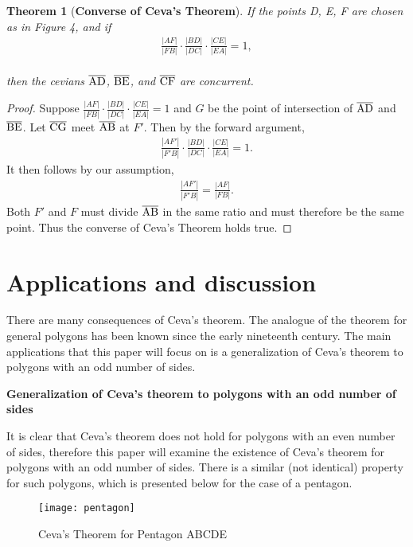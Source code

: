 \documentclass[12pt,a4paper,reqno,parskip=full]{amsart}
\numberwithin{equation}{section}
\theoremstyle{plain}
\newtheorem{theorem}[subsection]{Theorem}
\theoremstyle{definition}
\begin{document}
\begin{theorem} [\textbf{Converse of Ceva's Theorem}]
If the points D, E, F are chosen as in Figure 4, and if
\begin{align*}
\frac{|AF|}{|FB|}\cdot\frac{|BD|}{|DC|}\cdot\frac{|CE|}{|EA|} = 1,
\end{align*}
\\
then the cevians $\overline{\rm AD}$, $\overline{\rm BE}$, and $\overline{\rm CF}$ are concurrent.
\end{theorem}
\begin{proof}
Suppose $\frac{|AF|}{|FB|}\cdot\frac{|BD|}{|DC|}\cdot\frac{|CE|}{|EA|} = 1$ and $G$ be the point of intersection of $\overline{\rm AD}$ and $\overline{\rm BE}$. Let $\overline{\rm CG}$ meet $\overline{\rm AB}$ at $F'$. Then by the forward argument,
\\
\begin{align*}
\frac{|AF'|}{|F'B|}\cdot\frac{|BD|}{|DC|}\cdot\frac{|CE|}{|EA|} = 1.
\end{align*}
It then follows by our assumption,
\begin{align*}
\frac{|AF'|}{|F'B|} = \frac{|AF|}{|FB|}.
\end{align*}
Both $F'$ and $F$ must divide $\overline{\rm AB}$ in the same ratio and must therefore be the same point. Thus the converse of Ceva's Theorem holds true.
\end{proof}

\section{Applications and discussion}

There are many consequences of Ceva's theorem. The analogue of the theorem for general polygons has been known since the early nineteenth century.\cite{3} The main applications that this paper will focus on is a generalization of Ceva's theorem to polygons with an odd number of sides.

\textbf{Generalization of Ceva's theorem to polygons with an odd number of sides}

It is clear that Ceva's theorem does not hold for polygons with an even number of sides, therefore this paper will examine the existence of Ceva's theorem for polygons with an odd number of sides. There is a similar (not identical) property for such polygons, which is presented below for the case of a pentagon.

\begin{figure}[H]
    \centering
    \texttt{[image: pentagon]}
    \caption{Ceva's Theorem for Pentagon ABCDE}
    \label{fig:pentagon}
\end{figure}
\end{document}
